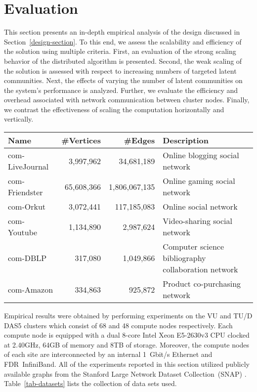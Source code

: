 \section{Evaluation}

This section presents an in-depth empirical analysis of the design discussed in
Section~\ref{design-section}. To this end, we assess the scalability and
efficiency of the solution using multiple criteria.
%
First, an evaluation of the strong scaling behavior of the distributed
algorithm is presented.
%
Second, the weak scaling of the solution is assessed with respect to increasing
numbers of targeted latent communities.
%
Next, the effects of varying the number of latent communities on the system's
performance is analyzed.
%
Further, we evaluate the efficiency and overhead associated with network
communication between cluster nodes.
%
Finally, we contrast the effectiveness of scaling the computation horizontally
and vertically.

\begin{table*}
  \centering
  \begin{tabular}{l r r l}
    Name            & \#Vertices &       \#Edges & Description \\
    \hline
    com-LiveJournal &  3,997,962 &    34,681,189 & Online blogging social network \\
    com-Friendster  & 65,608,366 & 1,806,067,135 & Online gaming social network \\
    com-Orkut       &  3,072,441 &   117,185,083 & Online social network \\
    com-Youtube     &  1,134,890 &     2,987,624 & Video-sharing social network \\
    com-DBLP        &    317,080 &     1,049,866 & Computer science bibliography collaboration network \\
    com-Amazon      &    334,863 &       925,872 & Product co-purchasing network \\
    \hline
  \end{tabular}
  \caption{Summary of SNAP graph data sets used for evaluation.}
  \label{tab-datasets}
\end{table*}

Empirical results were obtained by performing experiments on the VU and TU/D
DAS5 clusters which consist of 68 and 48 compute nodes respectively. Each
compute node is equipped with a dual 8-core Intel Xeon E5-2630v3 CPU clocked
at 2.40GHz, 64GB of memory and 8TB of storage. Moreover, the compute nodes of
each site are interconnected by an internal 1~Gbit/s Ethernet and
FDR~InfiniBand. All of the experiments reported in this section utilized
publicly available graphs from the Stanford Large Network Dataset
Collection~(SNAP) \cite{snapnets}. Table~\ref{tab-datasets} lists the
collection of data sets used.


